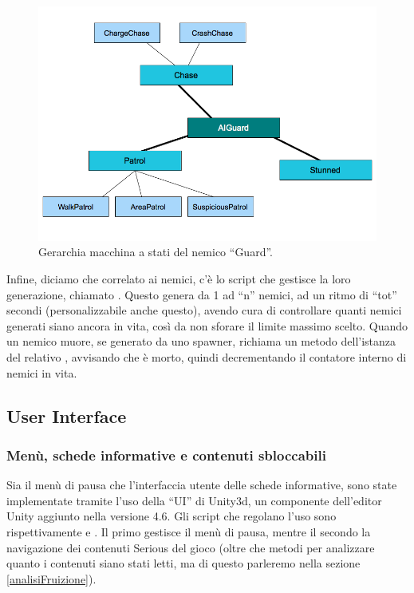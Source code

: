 \begin{figure}[h]
\centerline{\includegraphics[scale=0.45]{images/development/gerarchiaAIGuard.png}}
\caption{Gerarchia macchina a stati del nemico ``Guard''.}
\label{fig:gerarchiaAIGuard}
\end{figure}

Infine, diciamo che correlato ai nemici, c'è lo script che gestisce la loro generazione, chiamato . Questo genera da 1 ad ``n'' nemici, ad un ritmo di ``tot'' secondi (personalizzabile anche questo), avendo cura di controllare quanti nemici generati siano ancora in vita, così da non sforare il limite massimo scelto. Quando un nemico muore, se generato da uno spawner, richiama un metodo dell'istanza del relativo , avvisando che è morto, quindi decrementando il contatore interno di nemici in vita.

\subsection{User Interface}

\subsubsection{Menù, schede informative e contenuti sbloccabili}

Sia il menù di pausa che l'interfaccia utente delle schede informative, sono state implementate tramite l'uso della ``UI'' di Unity3d, un componente dell'editor Unity aggiunto nella versione 4.6. Gli script che regolano l'uso sono rispettivamente  e . Il primo gestisce il menù di pausa, mentre il secondo la navigazione dei contenuti Serious del gioco (oltre che metodi per analizzare quanto i contenuti siano stati letti, ma di questo parleremo nella sezione \ref{analisiFruizione}). 

